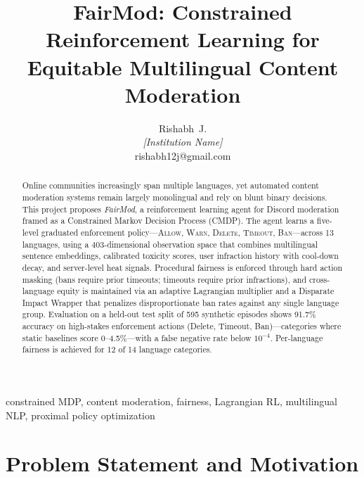 \documentclass[journal]{IEEEtran}
\begin{document}
\title{FairMod: Constrained Reinforcement Learning for\\
       Equitable Multilingual Content Moderation}

\author{Rishabh~J.\\
        \textit{[Institution Name]}\\
        rishabh12j@gmail.com}

\maketitle


\begin{abstract}
Online communities increasingly span multiple languages, yet automated content
moderation systems remain largely monolingual and rely on blunt binary decisions.
This project proposes \textit{FairMod}, a reinforcement learning agent for
Discord moderation framed as a Constrained Markov Decision Process (CMDP).
The agent learns a five-level graduated enforcement policy---\textsc{Allow},
\textsc{Warn}, \textsc{Delete}, \textsc{Timeout}, \textsc{Ban}---across 13
languages, using a 403-dimensional observation space that combines multilingual
sentence embeddings, calibrated toxicity scores, user infraction history with
cool-down decay, and server-level heat signals. Procedural fairness is enforced
through hard action masking (bans require prior timeouts; timeouts require prior
infractions), and cross-language equity is maintained via an adaptive Lagrangian
multiplier and a Disparate Impact Wrapper that penalizes disproportionate ban
rates against any single language group. Evaluation on a held-out test split of
595 synthetic episodes shows 91.7\% accuracy on high-stakes enforcement actions
(Delete, Timeout, Ban)---categories where static baselines score 0--4.5\%---with
a false negative rate below $10^{-4}$. Per-language fairness is achieved for 12
of 14 language categories.
\end{abstract}

\begin{IEEEkeywords}
constrained MDP, content moderation, fairness, Lagrangian RL, multilingual NLP,
proximal policy optimization
\end{IEEEkeywords}


\section{Problem Statement and Motivation}
\end{document}
